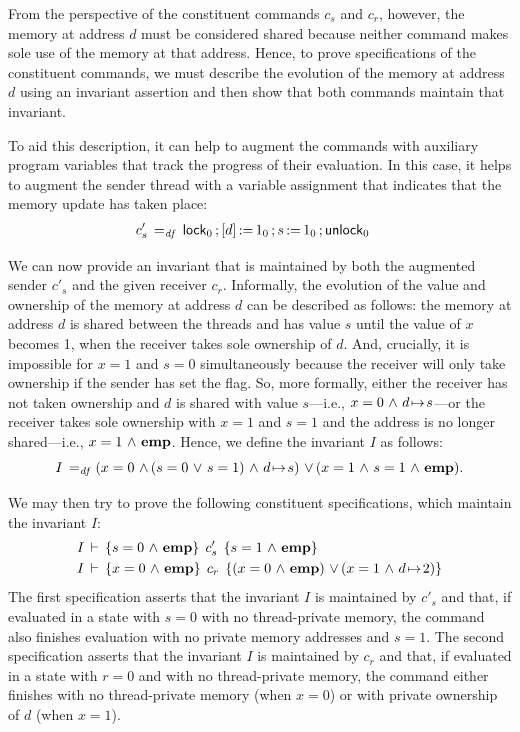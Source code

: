\documentclass[11pt]{report}         %
\begin{document}
From the perspective of the constituent commands $c_s$ and $c_r$, however, the memory at address $d$ must be considered shared because neither command makes sole use of the memory at that address. Hence, to prove specifications of the constituent commands, we must describe the evolution of the memory at address $d$ using an invariant assertion and then show that both commands maintain that invariant. 

To aid this description, it can help to augment the commands with auxiliary program variables that track the progress of their evaluation. In this case, it helps to augment the sender thread with a variable assignment that indicates that the memory update has taken place: 
\begin{align*}
c'_s \operatorname{\;=_{\mathit{df}}\;} & \operatorname{\mathsf{lock}}_0 \operatorname{;} \left[ d \right] \operatorname{:\!=} 1_0 \operatorname{;} s \operatorname{:\!=} 1_0 \operatorname{;} \operatorname{\mathsf{unlock}}_0
\end{align*}

We can now provide an invariant that is maintained by both the augmented sender $c'_s$ and the given receiver $c_r$. Informally, the evolution of the value and ownership of the memory at address $d$ can be described as follows: the memory at address $d$ is shared between the threads and has value $s$ until the value of $x$ becomes 1, when the receiver takes sole ownership of $d$. And, crucially, it is impossible for $x = 1$ and $s = 0$ simultaneously because the receiver will only take ownership if the sender has set the flag. So, more formally, either the receiver has not taken ownership and $d$ is shared with value $s$---i.e., $x = 0 \operatorname{\,\wedge\,} d \!\mapsto\! s$---or the receiver takes sole ownership with $x = 1$ and $s = 1$ and the address is no longer shared---i.e., $x = 1 \operatorname{\,\wedge\,} \mathbf{emp}$. Hence, we define the invariant $I$ as follows: \[ I \operatorname{\;=_{\mathit{df}}\;} (x = 0 \operatorname{\,\wedge\,} (s = 0 \operatorname{\,\vee\,} s = 1) \operatorname{\,\wedge\,} d \!\mapsto\! s) \operatorname{\,\vee\,} (x = 1 \operatorname{\,\wedge\,} s = 1 \operatorname{\,\wedge\,} \mathbf{emp}).\]

We may then try to prove the following constituent specifications, which maintain the invariant $I$: \begin{align*}
  &I\,\vdash\,\left\lbrace s = 0 \operatorname{\,\wedge\,} \mathbf{emp} \right\rbrace\;c'_s\;\left\lbrace s = 1 \operatorname{\,\wedge\,} \mathbf{emp} \right\rbrace \\
  &I\,\vdash\,\left\lbrace x = 0 \operatorname{\,\wedge\,} \mathbf{emp} \right\rbrace\;c_r\;\left\lbrace (x = 0 \operatorname{\,\wedge\,} \mathbf{emp}) \operatorname{\,\vee\,} (x = 1 \operatorname{\,\wedge\,} d \!\mapsto\! 2) \right\rbrace
\end{align*} The first specification asserts that the invariant $I$ is maintained by $c'_s$ and that, if evaluated in a state with $s = 0$ with no thread-private memory, the command also finishes evaluation with no private memory addresses and $s = 1$. The second specification asserts that the invariant $I$ is maintained by $c_r$ and that, if evaluated in a state with $r = 0$ and with no thread-private memory, the command either finishes with no thread-private memory (when $x = 0$) or with private ownership of $d$ (when $x = 1$). 
\end{document}
